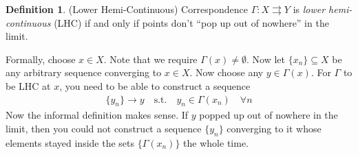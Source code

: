 \documentclass[12pt]{article}
\numberwithin{equation}{section} %
\theoremstyle{plain}
\theoremstyle{definition}
\newtheorem{defn}[thm]{Definition}
\theoremstyle{remark}
\begin{document}
\begin{defn}{(Lower Hemi-Continuous)}
Correspondence $\Gamma:X\rightrightarrows Y$ is \emph{lower
hemi-continuous} (LHC) if and only if points don't ``pop up out of
nowhere'' in the limit.

Formally, choose $x\in X$. Note that we require
$\Gamma(x)\neq\emptyset$. Now let $\{x_n\}\subseteq X$ be any arbitrary
sequence converging to $x\in X$. Now choose any $y\in\Gamma(x)$.  For
$\Gamma$ to be LHC at $x$, you need to be able to construct a sequence
\begin{align*}
  \{y_n\}\rightarrow y
  \quad\text{s.t.}\quad
  y_n \in \Gamma(x_n) \quad\forall n
\end{align*}
Now the informal definition makes sense. If $y$ popped up out of
nowhere in the limit, then you could not construct a sequence $\{y_n\}$
converging to it whose elements stayed inside the sets
$\{\Gamma({x_n})\}$ the whole time.
\end{defn}







\end{document}
